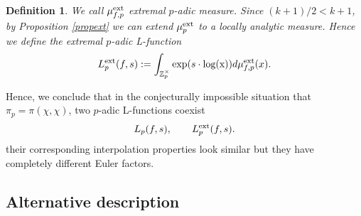 \documentclass{amsart}
\newtheorem{defn0}{Definition}[section]
\newenvironment{definition}{\begin{defn0}\rm}{\end{defn0}}
\newcommand{\Z}{{\mathbb Z}}
\begin{document}


\begin{definition}
We call $\mu_{f,p}^{\rm ext}$ \emph{extremal $p$-adic measure}.
Since $(k+1)/2<k+1$, by Proposition \ref{propext} we can extend $\mu_p^{\rm ext}$ to a locally analytic measure. Hence we define the \emph{extremal $p$-adic L-function}
\[
L_p^{\rm ext}(f,s):=\int_{\Z_p^\times}{\rm exp}(s\cdot{\rm log(x)})d\mu_{f,p}^{\rm ext}(x).
\]
\end{definition}



Hence, we conclude that in the conjecturally impossible situation that $\pi_p=\pi(\chi,\chi)$, two $p$-adic L-functions coexist
\[
L_p(f,s),\qquad L_p^{\rm ext}(f,s).
\] 
their corresponding interpolation properties look similar but they have completely different Euler factors. 

\subsection{Alternative description}
\end{document}
